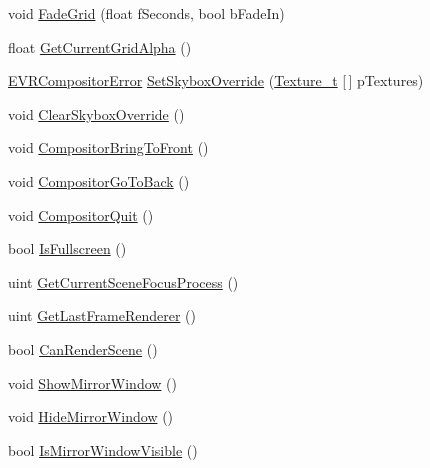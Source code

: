 \begin{DoxyCompactItemize}
\item 
void \mbox{\hyperlink{class_valve_1_1_v_r_1_1_c_v_r_compositor_a5a3244fc83b8da0ac59d8e9099947684}{Fade\+Grid}} (float f\+Seconds, bool b\+Fade\+In)
\item 
float \mbox{\hyperlink{class_valve_1_1_v_r_1_1_c_v_r_compositor_a2d0070dfc0c115fd4901bc0cd03893dd}{Get\+Current\+Grid\+Alpha}} ()
\item 
\mbox{\hyperlink{namespace_valve_1_1_v_r_ac34ee1034fda668ccd45f57676ded81b}{E\+V\+R\+Compositor\+Error}} \mbox{\hyperlink{class_valve_1_1_v_r_1_1_c_v_r_compositor_a45eec10604e2c3578b6fa7b16f05d072}{Set\+Skybox\+Override}} (\mbox{\hyperlink{struct_valve_1_1_v_r_1_1_texture__t}{Texture\+\_\+t}} \mbox{[}$\,$\mbox{]} p\+Textures)
\item 
void \mbox{\hyperlink{class_valve_1_1_v_r_1_1_c_v_r_compositor_a307b9e6e784e7654e1f6a209ba283bdc}{Clear\+Skybox\+Override}} ()
\item 
void \mbox{\hyperlink{class_valve_1_1_v_r_1_1_c_v_r_compositor_ae669a3f67583f54b0800ad402abc9a4c}{Compositor\+Bring\+To\+Front}} ()
\item 
void \mbox{\hyperlink{class_valve_1_1_v_r_1_1_c_v_r_compositor_a911ea002d43e94430f1c832fbf2809cd}{Compositor\+Go\+To\+Back}} ()
\item 
void \mbox{\hyperlink{class_valve_1_1_v_r_1_1_c_v_r_compositor_a29223e5d21d6b16ad657d830c3ee0aad}{Compositor\+Quit}} ()
\item 
bool \mbox{\hyperlink{class_valve_1_1_v_r_1_1_c_v_r_compositor_a8d9c2a37367803beea6f015e65d37cf8}{Is\+Fullscreen}} ()
\item 
uint \mbox{\hyperlink{class_valve_1_1_v_r_1_1_c_v_r_compositor_a7029fd08d6f8b4e2f725ca7488039601}{Get\+Current\+Scene\+Focus\+Process}} ()
\item 
uint \mbox{\hyperlink{class_valve_1_1_v_r_1_1_c_v_r_compositor_a562621ffd7698e2c7dbdaf653a73ff00}{Get\+Last\+Frame\+Renderer}} ()
\item 
bool \mbox{\hyperlink{class_valve_1_1_v_r_1_1_c_v_r_compositor_a6b732598f98df9faaef2687f95e72582}{Can\+Render\+Scene}} ()
\item 
void \mbox{\hyperlink{class_valve_1_1_v_r_1_1_c_v_r_compositor_af78edd931b782d5e579515cb4f3fa1b9}{Show\+Mirror\+Window}} ()
\item 
void \mbox{\hyperlink{class_valve_1_1_v_r_1_1_c_v_r_compositor_a083c0219863318019461d31b512de406}{Hide\+Mirror\+Window}} ()
\item 
bool \mbox{\hyperlink{class_valve_1_1_v_r_1_1_c_v_r_compositor_a70ed72ae8e8e200649b4bff2e54d0f5d}{Is\+Mirror\+Window\+Visible}} ()

\end{DoxyCompactItemize}
